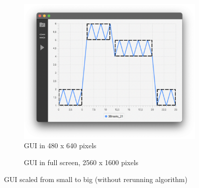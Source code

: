 \begin{figure}[ht]
    \centering
    \begin{subfigure}[b]{.48\textwidth}
        \centering
        \includegraphics[width=\textwidth]{fig/gui-small-screen.png}
        \caption{GUI in 480 x 640 pixels}
        \label{fig:gui-small-screen}
    \end{subfigure}
    \hfill
    \begin{subfigure}[b]{.48\textwidth}
        \centering
        \caption{GUI in full screen, 2560 x 1600 pixels}
        \label{fig:gui-full-screen}
    \end{subfigure}
    \caption{GUI scaled from small to big (without rerunning algorithm)}
    \label{fig:gui-scaling}
\end{figure}

